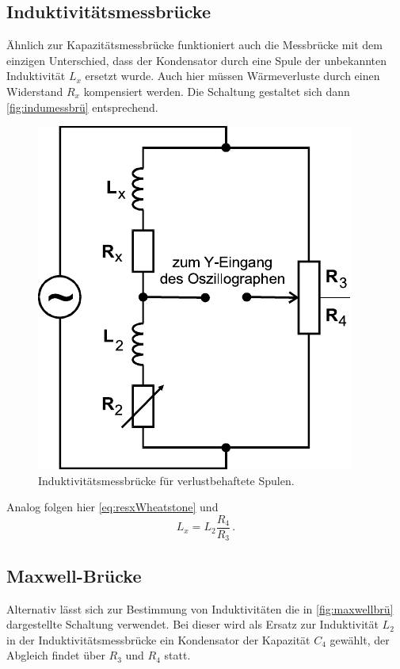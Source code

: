 \subsection{Induktivitätsmessbrücke}
\label{subsec:indumessbrü}

Ähnlich zur Kapazitätsmessbrücke funktioniert auch die Messbrücke mit dem einzigen Unterschied, dass der Kondensator durch eine Spule der unbekannten Induktivität $L_x$ ersetzt wurde.
Auch hier müssen Wärmeverluste durch einen Widerstand $R_x$ kompensiert werden. Die Schaltung gestaltet sich dann \autoref{fig:indumessbrü} entsprechend.

\begin{figure}[H]
    \centering
    \includegraphics{figures/Induktivitätsmessbrücke.pdf}
    \caption{Induktivitätsmessbrücke für verlustbehaftete Spulen\cite{ap07}.}
    \label{fig:indumessbrü}
\end{figure}

Analog folgen hier \eqref{eq:resxWheatstone} und
\begin{equation}
    L_x = L_2 \frac{R_4}{R_3}\,.
    \label{eq:induxindubrü}
\end{equation}

\newpage

\subsection{Maxwell-Brücke}
\label{subsec:maxwellbrü}

Alternativ lässt sich zur Bestimmung von Induktivitäten die in \autoref{fig:maxwellbrü} dargestellte
Schaltung verwendet.
Bei dieser wird als Ersatz zur Induktivität $L_2$ in der Induktivitätsmessbrücke ein Kondensator
der Kapazität $C_4$ gewählt, der Abgleich findet über $R_3$ und $R_4$ statt.

